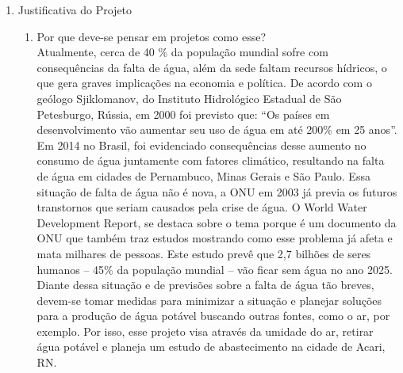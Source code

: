 \begin{enumerate}
  \item Justificativa do Projeto\\
  \begin{enumerate}[label=\Alph*]
  \item Por que deve-se pensar em projetos como esse?\\
  Atualmente, cerca de 40 \% da população mundial sofre com consequências da falta de água, além da sede faltam recursos hídricos, o que gera graves implicações na economia e política. De acordo com o geólogo Sjiklomanov, do Instituto Hidrológico Estadual de São Petesburgo, Rússia, em 2000 foi previsto que: “Os países em desenvolvimento vão aumentar seu uso de água em até 200\% em 25 anos”. Em 2014 no Brasil, foi evidenciado consequências desse aumento no consumo de água juntamente com fatores climático, resultando na falta de água em cidades de Pernambuco, Minas Gerais e São Paulo.
  Essa situação de falta de água não é nova, a ONU em 2003 já previa os futuros transtornos que seriam causados pela crise de água. O World Water Development Report, se destaca sobre o tema porque é um documento da ONU que também traz estudos mostrando como esse problema já afeta e mata milhares de pessoas. Este estudo prevê que 2,7 bilhões de seres humanos – 45\% da população mundial – vão ficar sem água no ano 2025.
  Diante dessa situação e de previsões sobre a falta de água tão breves, devem-se tomar medidas para minimizar a situação e planejar soluções para a produção de água potável buscando outras fontes, como o ar, por exemplo. Por isso, esse projeto visa através da umidade do ar, retirar água potável e planeja um estudo de abastecimento na cidade de Acari, RN.


\end{enumerate}
\end{enumerate}
